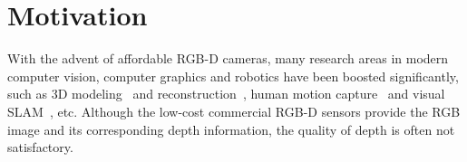 
\section{Motivation}
With the advent of affordable RGB-D cameras, many research areas in modern computer vision, computer graphics and robotics have been boosted significantly, such as 3D modeling~\cite{sturm_etal_2013gcpr} and reconstruction~\cite{maier2014gcpr}, human motion capture~\cite{zhang2012real} and visual SLAM~\cite{engelhard2011real, kerl2013dense}, etc.
Although the low-cost commercial RGB-D sensors provide the RGB image and its corresponding depth information, the quality of depth is often not satisfactory.


